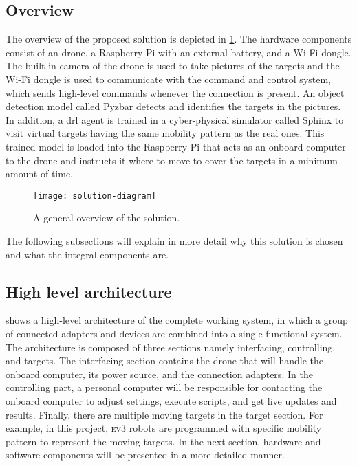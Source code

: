 \documentclass[../main.tex]{subfiles}
\begin{document}
\subsection{Overview}

The overview of the proposed solution is depicted in 
\cref{fig:solution-overview}. 
The hardware components consist of an \anafi drone,
a Raspberry Pi with an external battery, and a Wi-Fi
dongle. The built-in camera of the drone is used to
take pictures of the targets and the Wi-Fi dongle
is used to communicate with the command and control
system, which sends high-level commands whenever the
connection is present. 
An object detection model called Pyzbar detects and identifies the
targets in the pictures. 
In addition, a \gls{drl} agent is trained 
in a cyber-physical simulator called Sphinx to
visit virtual targets having the same mobility pattern as the
real ones.
This trained model is loaded into the Raspberry Pi that acts
as an onboard computer to the \anafi drone and instructs
it where to move to cover the targets in a minimum amount
of time.

\begin{figure}[tbp]
	\centering
	\texttt{[image: solution-diagram]}
	\caption{A general overview of the solution.}
	\label{fig:solution-overview}
\end{figure}

The following subsections will
explain in more detail why this solution is chosen
and what the integral components are.

\subsection{High level architecture}

 shows a high-level architecture 
of the complete working system, in which a group 
of connected adapters and devices are combined into 
a single functional system. 
The architecture is composed of three sections namely
interfacing, controlling, and targets. 
The interfacing section contains the drone that 
will handle the onboard computer, its power source, 
and the connection adapters. 
In the controlling part, a personal computer 
will be responsible for contacting the onboard computer 
to adjust settings, execute scripts, and get 
live updates and results. 
Finally, there are multiple moving targets 
in the target section. For example, 
in this project, \textsc{ev}3 robots are programmed with specific
mobility pattern to represent the moving targets.
In the next section, hardware and software components 
will be presented in a more detailed manner.
\end{document}
